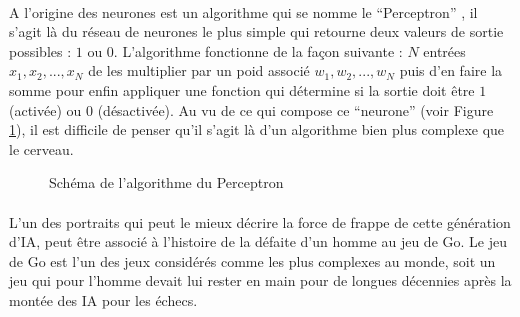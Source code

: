 \documentclass[10pt, french, a4paper]{report}
\begin{document}
\paragraph{}
A l'origine des neurones est un algorithme qui se nomme le ``Perceptron'' \citep{rosenblatt_perceptron_1958}, il s'agit là du réseau de neurones le plus simple qui retourne deux valeurs de sortie possibles : $1$ ou $0$. L'algorithme fonctionne de la façon suivante : $N$ entrées $x_1, x_2, ..., x_N$ de les multiplier par un poid associé $w_1, w_2, ..., w_N$ puis d'en faire la somme pour enfin appliquer une fonction qui détermine si la sortie doit être $1$ (activée) ou $0$ (désactivée). Au vu de ce qui compose ce ``neurone'' (voir Figure \ref{fig:perceptron}), il est difficile de penser qu'il s'agit là d'un algorithme bien plus complexe que le cerveau.

\begin{center}
\begin{figure}[hbt!]
    \caption{Schéma de l'algorithme du Perceptron \citep{rosenblatt_perceptron_1958}}
    \label{fig:perceptron}
\end{figure}
\end{center}

\paragraph{}
L’un des portraits qui peut le mieux décrire la force de frappe de cette génération d’IA, peut être associé à l’histoire de la défaite d’un homme au jeu de Go. Le jeu de Go est l’un des jeux considérés comme les plus complexes au monde, soit un jeu qui pour l’homme devait lui rester en main pour de longues décennies après la montée des IA pour les échecs.
\end{document}
